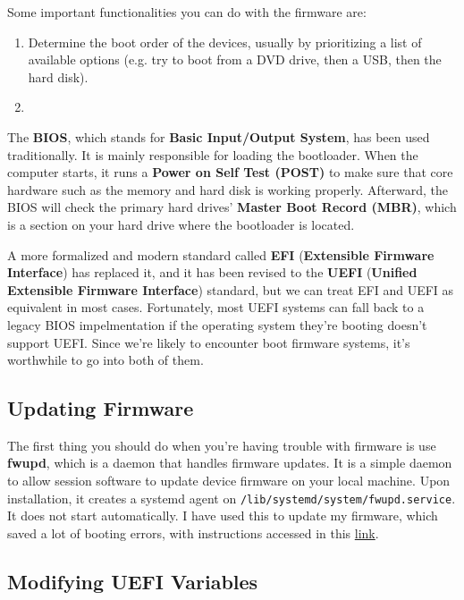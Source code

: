 \documentclass{article}
\begin{document}
    Some important functionalities you can do with the firmware are: 
    \begin{enumerate} 
      \item Determine the boot order of the devices, usually by prioritizing a list of available options (e.g. try to boot from a DVD drive, then a USB, then the hard disk). 
      \item 
    \end{enumerate}

    The \textbf{BIOS}, which stands for \textbf{Basic Input/Output System}, has been used traditionally. It is mainly responsible for loading the bootloader. When the computer starts, it runs a \textbf{Power on Self Test (POST)} to make sure that core hardware such as the memory and hard disk is working properly. Afterward, the BIOS will check the primary hard drives' \textbf{Master Boot Record (MBR)}, which is a section on your hard drive where the bootloader is located. 

    A more formalized and modern standard called \textbf{EFI} (\textbf{Extensible Firmware Interface}) has replaced it, and it has been revised to the \textbf{UEFI} (\textbf{Unified Extensible Firmware Interface}) standard, but we can treat EFI and UEFI as equivalent in most cases. Fortunately, most UEFI systems can fall back to a legacy BIOS impelmentation if the operating system they're booting doesn't support UEFI. Since we're likely to encounter boot firmware systems, it's worthwhile to go into both of them. 

  \subsection{Updating Firmware}

    The first thing you should do when you're having trouble with firmware is use \textbf{fwupd}, which is a daemon that handles firmware updates. It is a simple daemon to allow session software to update device firmware on your local machine. Upon installation, it creates a systemd agent on \texttt{/lib/systemd/system/fwupd.service}. It does not start automatically. I have used this to update my firmware, which saved a lot of booting errors, with instructions accessed in this \href{https://wiki.archlinux.org/title/fwupd}{link}. 

  \subsection{Modifying UEFI Variables}
\end{document}

